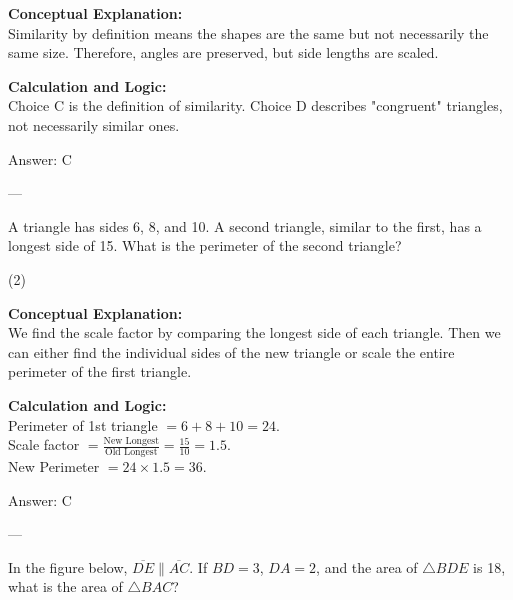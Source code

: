 \documentclass[11pt,paper=a4,answers]{exam}
\begin{document}
\begin{questions}
\begin{solution}
\textbf{Conceptual Explanation:} \\
Similarity by definition means the shapes are the same but not necessarily the same size. Therefore, angles are preserved, but side lengths are scaled.

\vspace{10pt}
\textbf{Calculation and Logic:} \\
Choice C is the definition of similarity. Choice D describes "congruent" triangles, not necessarily similar ones.

\vspace{15pt}
Answer: \colorbox{yellow!100}{C}
\end{solution}

---

\question
A triangle has sides 6, 8, and 10. A second triangle, similar to the first, has a longest side of 15. What is the perimeter of the second triangle?
\begin{tasks}(2)
\end{tasks}

\begin{solution}
\textbf{Conceptual Explanation:} \\
We find the scale factor by comparing the longest side of each triangle. Then we can either find the individual sides of the new triangle or scale the entire perimeter of the first triangle.

\vspace{10pt}
\textbf{Calculation and Logic:} \\
Perimeter of 1st triangle $= 6 + 8 + 10 = 24$. \\
Scale factor $= \frac{\text{New Longest}}{\text{Old Longest}} = \frac{15}{10} = 1.5$. \\
New Perimeter $= 24 \times 1.5 = 36$.

\vspace{15pt}
Answer: \colorbox{yellow!100}{C}
\end{solution}

---

\question
In the figure below, $\overline{DE} \parallel \overline{AC}$. If $BD = 3$, $DA = 2$, and the area of $\triangle BDE$ is 18, what is the area of $\triangle BAC$?
\begin{center}
\end{center}


\end{questions}
\end{document}
